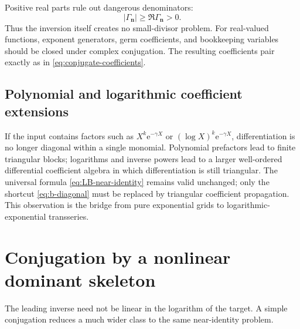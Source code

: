 \documentclass[11pt,oneside]{article}
\numberwithin{equation}{section}
\newcommand{\e}{\mathrm{e}}
\newcommand{\vct}[1]{\boldsymbol{#1}}
\begin{document}
Positive real parts rule out dangerous denominators:
\begin{equation}
  |\Gamma_{\vct n}|\ge\Re\Gamma_{\vct n}>0.
  \label{eq:no-small-divisor}
\end{equation}
Thus the inversion itself creates no small-divisor problem.  For real-valued
functions, exponent generators, germ coefficients, and bookkeeping variables
should be closed under complex conjugation.  The resulting coefficients pair
exactly as in \cref{eq:conjugate-coefficients}.

\subsection{Polynomial and logarithmic coefficient extensions}

If the input contains factors such as \(X^k\e^{-\gamma X}\) or
\((\log X)^k\e^{-\gamma X}\), differentiation is no longer diagonal within a
single monomial.  Polynomial prefactors lead to finite triangular blocks;
logarithms and inverse powers lead to a larger well-ordered differential
coefficient algebra in which differentiation is still triangular.  The
universal formula \cref{eq:LB-near-identity} remains valid unchanged; only the
shortcut \cref{eq:b-diagonal} must be replaced by triangular coefficient
propagation.  This observation is the bridge from pure exponential grids to
logarithmic-exponential transseries.

\section{Conjugation by a nonlinear dominant skeleton}
\label{sec:skeleton}

The leading inverse need not be linear in the logarithm of the target.  A
simple conjugation reduces a much wider class to the same near-identity
problem.
\end{document}
